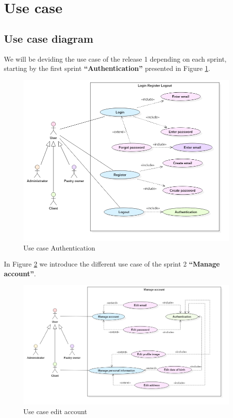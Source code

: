 \documentclass[12pt,a4paper]{report}
\begin{document}
\section{Use case}
\subsection{Use case diagram}
We will be deviding the use case of the release 1 depending on each sprint, starting by the first sprint \textbf{``Authentication''} presented in Figure \ref{auth-diag}.
\begin{figure}[H]
	\vspace*{2cm}
	\centering
	\includegraphics[width=7.2in,keepaspectratio]{auth.png}
	\caption{Use case Authentication}
	\label{auth-diag}
\end{figure}
\clearpage
In Figure \ref{edit-account} we introduce the different use case of the sprint 2 \textbf{``Manage account''}.
\begin{figure}[H]
	\vspace*{3cm}
	\centering
	\includegraphics[width=7.2in,keepaspectratio]{manageAccount.png}
	\caption{Use case edit account}
	\label{edit-account}
\end{figure}
\end{document}
